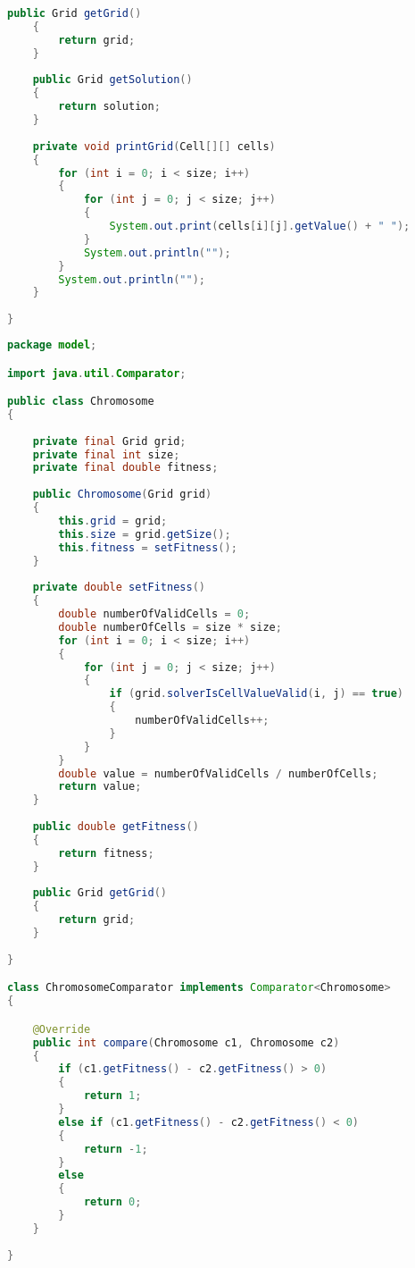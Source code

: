 \begin{lstlisting}[language=Java,basicstyle=\tiny,caption=SolverGenetic.java]
    public Grid getGrid()
    {
        return grid;
    }
    
    public Grid getSolution()
    {
        return solution;
    }
    
    private void printGrid(Cell[][] cells)
    {
        for (int i = 0; i < size; i++)
        {
            for (int j = 0; j < size; j++)
            {
                System.out.print(cells[i][j].getValue() + " ");
            }
            System.out.println("");
        }
        System.out.println("");
    }
    
}
\end{lstlisting}

\begin{lstlisting}[language=Java,basicstyle=\tiny,caption=Chromosome.java]
package model;

import java.util.Comparator;

public class Chromosome
{
    
    private final Grid grid;
    private final int size;
    private final double fitness;
    
    public Chromosome(Grid grid)
    {
        this.grid = grid;
        this.size = grid.getSize();
        this.fitness = setFitness();
    }
    
    private double setFitness()
    {
        double numberOfValidCells = 0;
        double numberOfCells = size * size;
        for (int i = 0; i < size; i++)
        {
            for (int j = 0; j < size; j++)
            {
                if (grid.solverIsCellValueValid(i, j) == true)
                {
                    numberOfValidCells++;
                }
            }
        }
        double value = numberOfValidCells / numberOfCells;
        return value;
    }
    
    public double getFitness()
    {
        return fitness;
    }
    
    public Grid getGrid()
    {
        return grid;
    }
    
}

class ChromosomeComparator implements Comparator<Chromosome>
{

    @Override
    public int compare(Chromosome c1, Chromosome c2)
    {
        if (c1.getFitness() - c2.getFitness() > 0)
        {
            return 1;
        }
        else if (c1.getFitness() - c2.getFitness() < 0)
        {
            return -1;
        }
        else
        {
            return 0;
        }
    }
    
}
\end{lstlisting}

